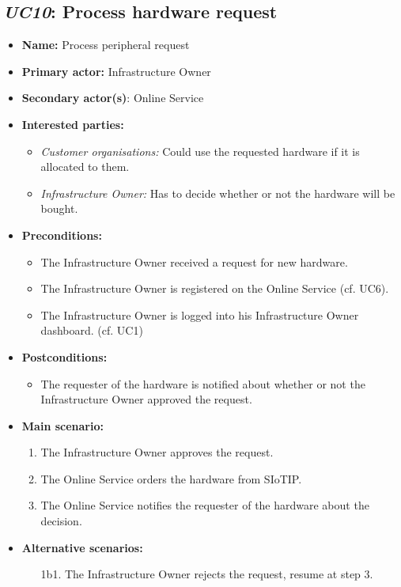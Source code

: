 \subsection{\emph{UC10}: Process hardware request}
\begin{itemize}
    \item \textbf{Name:} Process peripheral request
    \item \textbf{Primary actor:} Infrastructure Owner
    \item \textbf{Secondary actor(s)}: Online Service
    \item \textbf{Interested parties:} 
        \begin{itemize}
            \item \textit{Customer organisations:} Could use the requested hardware if it is allocated to them.
            \item \textit{Infrastructure Owner:} Has to decide whether or not the hardware will be bought.
        \end{itemize}

    \item \textbf{Preconditions:}
        \begin{itemize}
            \item The Infrastructure Owner received a request for new hardware.
            \item The Infrastructure Owner is registered on the Online Service (cf. UC6).
            \item The Infrastructure Owner is logged into his Infrastructure Owner dashboard. (cf. UC1)
        \end{itemize}

    \item \textbf{Postconditions:}
        \begin{itemize}
            \item The requester of the hardware is notified about whether or not the Infrastructure Owner approved the request.
        \end{itemize}
        
    \item \textbf{Main scenario:} 
    \begin{enumerate}
       \item The Infrastructure Owner approves the request.
       \item The Online Service orders the hardware from SIoTIP.
       \item The Online Service notifies the requester of the hardware about the decision.
    \end{enumerate}

    \item \textbf{Alternative scenarios:} 
    \begin{enumerate}
        \item [1b1.] The Infrastructure Owner rejects the request, resume at step 3.
    \end{enumerate}
\end{itemize}

